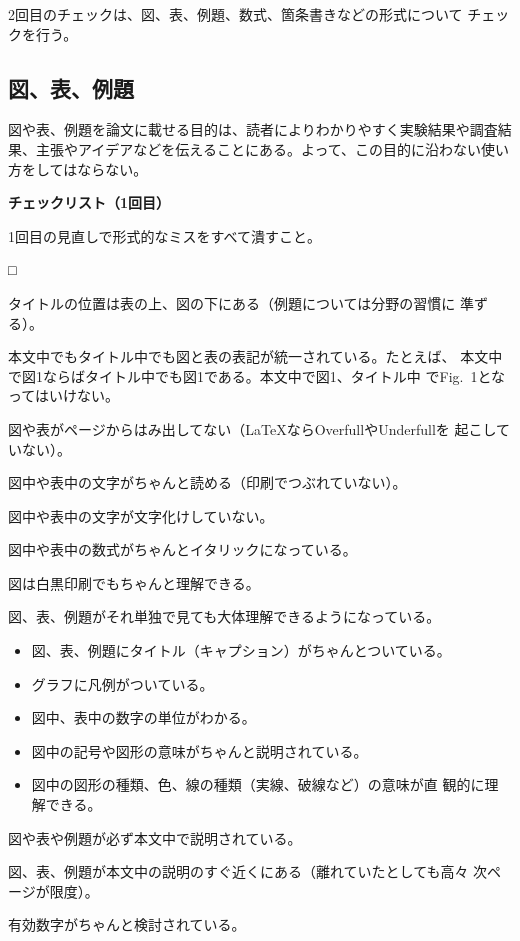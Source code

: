\documentclass[11pt,a4j]{jsarticle}
\begin{document}
2回目のチェックは、図、表、例題、数式、箇条書きなどの形式について
チェックを行う。

\subsection{図、表、例題}

図や表、例題を論文に載せる目的は、読者によりわかりやすく実験結果や調査結
果、主張やアイデアなどを伝えることにある。よって、この目的に沿わない使い
方をしてはならない。

\begin{flushleft}
 {\bf チェックリスト（1回目）}
\end{flushleft}
1回目の見直しで形式的なミスをすべて潰すこと。
\begin{list}%
 {□} %
 {} %
 \item タイトルの位置は表の上、図の下にある（例題については分野の習慣に
       準ずる）。
 \item 本文中でもタイトル中でも図と表の表記が統一されている。たとえば、
       本文中で図1ならばタイトル中でも図1である。本文中で図1、タイトル中
       でFig.\ 1となってはいけない。
 \item 図や表がページからはみ出してない（LaTeXならOverfullやUnderfullを
       起こしていない）。
 \item 図中や表中の文字がちゃんと読める（印刷でつぶれていない）。
 \item 図中や表中の文字が文字化けしていない。
 \item 図中や表中の数式がちゃんとイタリックになっている。
 \item 図は白黒印刷でもちゃんと理解できる。
 \item 図、表、例題がそれ単独で見ても大体理解できるようになっている。
       \begin{itemize}
	\item 図、表、例題にタイトル（キャプション）がちゃんとついている。
	\item グラフに凡例がついている。
	\item 図中、表中の数字の単位がわかる。
	\item 図中の記号や図形の意味がちゃんと説明されている。
	\item 図中の図形の種類、色、線の種類（実線、破線など）の意味が直
	      観的に理解できる。
       \end{itemize}
 \item 図や表や例題が必ず本文中で説明されている。
 \item 図、表、例題が本文中の説明のすぐ近くにある（離れていたとしても高々
       次ページが限度）。
 \item 有効数字がちゃんと検討されている。
\end{list}
\end{document}
